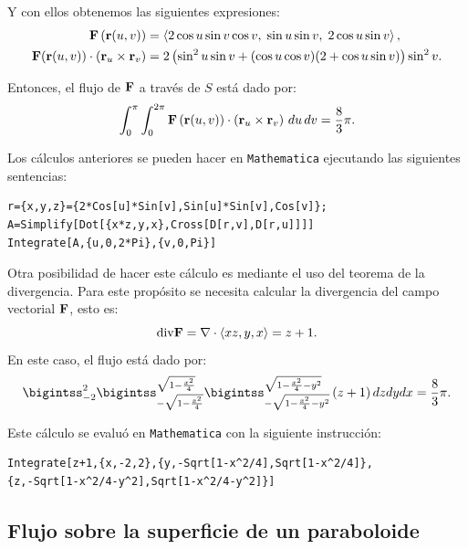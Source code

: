 Y con ellos obtenemos las siguientes expresiones:
\begin{gather*}
\begin{aligned}
{\bf F}\left( {\bf r}(u,v) \right) &=
\left\langle
2\cos u \sin v \cos v,\;
\sin u \sin v,\;
2\cos u \sin v
\right\rangle, \\
{\bf F}({\bf r}(u,v)) \cdot ({\bf r}_{u} \times {\bf r}_{v}) & =
2\left(
\sin^{2} u \sin v + (\cos u \cos v)(2 + \cos u \sin v)
\right) \sin^{2} v.
\end{aligned}
\end{gather*}

Entonces, el flujo de ${\bf F}$ a través de $S$ está dado por:
\[
\int_{0}^{\pi} \int_{0}^{2\pi}
{\bf F}\left( {\bf r}(u,v) \right) \cdot \left({\bf r}_{u} \times {\bf r}_{v}\right)
\, du\, dv = \frac{8}{3}\pi.
\]

Los cálculos anteriores se pueden hacer en \verb|Mathematica| ejecutando las siguientes sentencias:

\begin{tcolorbox}[title=\bf Instrucción \verb"Mathematica"]\begin{Verbatim}[formatcom=\letraverbatim]
r={x,y,z}={2*Cos[u]*Sin[v],Sin[u]*Sin[v],Cos[v]};
A=Simplify[Dot[{x*z,y,x},Cross[D[r,v],D[r,u]]]]
Integrate[A,{u,0,2*Pi},{v,0,Pi}]
\end{Verbatim}
\end{tcolorbox}

Otra posibilidad de hacer este cálculo es mediante el uso del teorema de la divergencia.
Para este propósito se necesita calcular la divergencia del campo vectorial ${\bf F}$, esto es:
\[{\rm div}{\bf F}=\nabla \cdot \langle xz,y,x\rangle = z+1.\]
En este caso, el flujo está dado por:
\[\bigintss_{-2}^{2}\bigintss_{-\sqrt{1-\frac{x^{2}}{4}}}^{\sqrt{1-\frac{x^{2}}{4}}}\bigintss_{-\sqrt{1-\frac{x^{2}}{4}-y^{2}}}^{\sqrt{1-\frac{x^{2}}{4}-y^{2}}}\left( z+1\right)dzdydx= \frac{8}{3}\pi.\]

Este cálculo se evaluó en \verb"Mathematica" con la siguiente instrucción:

\begin{tcolorbox}[title=\bf Instrucción \verb"Mathematica"]\begin{Verbatim}[formatcom=\letraverbatim]
Integrate[z+1,{x,-2,2},{y,-Sqrt[1-x^2/4],Sqrt[1-x^2/4]},
{z,-Sqrt[1-x^2/4-y^2],Sqrt[1-x^2/4-y^2]}]
\end{Verbatim}
\end{tcolorbox}

\subsection{Flujo sobre la superficie de un paraboloide}

